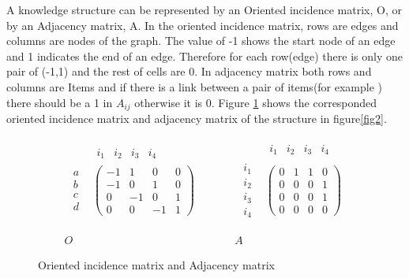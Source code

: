 A knowledge structure can be represented by an Oriented incidence matrix, O, or by an Adjacency matrix, A. In the oriented incidence matrix, rows are edges and columns are nodes of the graph. The value of -1 shows the start node of an edge and 1 indicates the end of an edge. Therefore for each row(edge) there is only one pair of (-1,1) and the rest of cells are 0. In adjacency matrix both rows and columns are Items and if there is a link between a pair of items(for example \DIFdelbegin {}\DIFdelend \DIFaddbegin {}\DIFaddend ) there should be a 1 in $A_{ij}$ otherwise it is 0. Figure \ref{fig3IMAM} shows the corresponded oriented incidence matrix and adjacency matrix of the structure in figure\ref{fig2}.


\begin{figure}
\[
\begin{array}{ccccc}
\begin{array}{cc}
 & \begin{array}{cccc}
i_{1} & i_{2} & i_{3} & i_{4}\end{array}\\
\begin{array}{c}
a\\
b\\
c\\
d
\end{array} & \left(\begin{array}{cccc}
-1 & 1 & 0 & 0\\
-1 & 0 & 1 & 0\\
0 & -1 & 0 & 1\\
0 & 0 & -1 & 1
\end{array}\right)
\end{array} &  &  &  & \begin{array}{cc}
 & \begin{array}{cccc}
i_{1} & i_{2} & i_{3} & i_{4}\end{array}\\
\begin{array}{c}
i_{1}\\
i_{2}\\
i_{3}\\
i_{4}
\end{array} & \left(\begin{array}{cccc}
0 & 1 & 1 & 0\\
0 & 0 & 0 & 1\\
0 & 0 & 0 & 1\\
0 & 0 & 0 & 0
\end{array}\right)
\end{array}\\
\\
\\
O &  &  &  & A
\end{array}
\]


\caption{Oriented incidence matrix and Adjacency matrix}
\label{fig3IMAM}
\end{figure}


